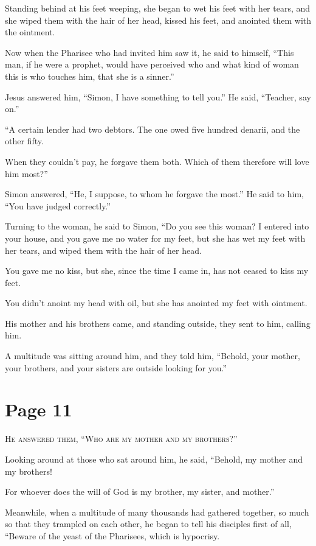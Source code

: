 Standing behind at his feet weeping, she began to wet his feet with her tears, and she wiped them with the hair of her head, kissed his feet, and anointed them with the ointment.

Now when the Pharisee who had invited him saw it, he said to himself, “This man, if he were a prophet, would have perceived who and what kind of woman this is who touches him, that she is a sinner.”

Jesus answered him, “Simon, I have something to tell you.” He said, “Teacher, say on.”

“A certain lender had two debtors. The one owed five hundred denarii, and the other fifty.

When they couldn’t pay, he forgave them both. Which of them therefore will love him most?”

Simon answered, “He, I suppose, to whom he forgave the most.” He said to him, “You have judged correctly.”

Turning to the woman, he said to Simon, “Do you see this woman? I entered into your house, and you gave me no water for my feet, but she has wet my feet with her tears, and wiped them with the hair of her head.

You gave me no kiss, but she, since the time I came in, has not ceased to kiss my feet.

You didn’t anoint my head with oil, but she has anointed my feet with ointment.

His mother and his brothers came, and standing outside, they sent to him, calling him.

A multitude was sitting around him, and they told him, “Behold, your mother, your brothers, and your sisters are outside looking for you.”



\chapterornament
\section*{Page 11}

\lettrine{H}{e answered them, “Who are my mother and my brothers?”}

Looking around at those who sat around him, he said, “Behold, my mother and my brothers!

For whoever does the will of God is my brother, my sister, and mother.”

Meanwhile, when a multitude of many thousands had gathered together, so much so that they trampled on each other, he began to tell his disciples first of all, “Beware of the yeast of the Pharisees, which is hypocrisy.

